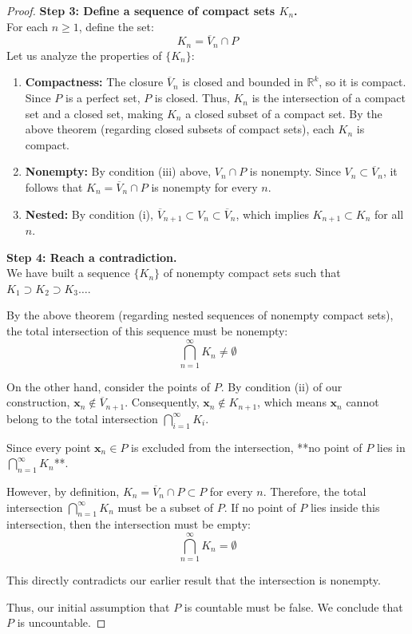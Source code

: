 \documentclass{article}
\theoremstyle{mythm}
\begin{document}
\begin{proof}
\textbf{Step 3: Define a sequence of compact sets $K_n$.} \\
For each $n \ge 1$, define the set:
\[ K_n = \overline{V}_n \cap P \]
Let us analyze the properties of $\{K_n\}$:
\begin{enumerate}
    \item \textbf{Compactness:} The closure $\overline{V}_n$ is closed and bounded in $\mathbb{R}^k$, so it is compact. Since $P$ is a perfect set, $P$ is closed. Thus, $K_n$ is the intersection of a compact set and a closed set, making $K_n$ a closed subset of a compact set. By the above theorem (regarding closed subsets of compact sets), each $K_n$ is compact.
    \item \textbf{Nonempty:} By condition (iii) above, $V_n \cap P$ is nonempty. Since $V_n \subset \overline{V}_n$, it follows that $K_n = \overline{V}_n \cap P$ is nonempty for every $n$.
    \item \textbf{Nested:} By condition (i), $\overline{V}_{n+1} \subset V_n \subset \overline{V}_n$, which implies $K_{n+1} \subset K_n$ for all $n$.
\end{enumerate}

\textbf{Step 4: Reach a contradiction.} \\
We have built a sequence $\{K_n\}$ of nonempty compact sets such that $K_1 \supset K_2 \supset K_3 \dots$. 

By the above theorem (regarding nested sequences of nonempty compact sets), the total intersection of this sequence must be nonempty:
\[ \bigcap_{n=1}^\infty K_n \neq \emptyset \]

On the other hand, consider the points of $P$. By condition (ii) of our construction, $\mathbf{x}_n \notin \overline{V}_{n+1}$. Consequently, $\mathbf{x}_n \notin K_{n+1}$, which means $\mathbf{x}_n$ cannot belong to the total intersection $\bigcap_{i=1}^\infty K_i$.

Since every point $\mathbf{x}_n \in P$ is excluded from the intersection, **no point of $P$ lies in $\bigcap_{n=1}^\infty K_n$**. 

However, by definition, $K_n = \overline{V}_n \cap P \subset P$ for every $n$. Therefore, the total intersection $\bigcap_{n=1}^\infty K_n$ must be a subset of $P$. If no point of $P$ lies inside this intersection, then the intersection must be empty:
\[ \bigcap_{n=1}^\infty K_n = \emptyset \]

This directly contradicts our earlier result that the intersection is nonempty. 

Thus, our initial assumption that $P$ is countable must be false. We conclude that $P$ is uncountable.
\end{proof}
\end{document}
